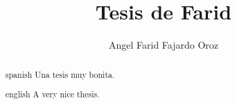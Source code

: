 \documentclass{tesisITAM}
\title{Tesis de Farid}
\author{Angel Farid Fajardo Oroz}
\begin{document}
	\npthousandsep{,}
	\maketitle
	\publicationrights
	

	
	


	\begin{abstract}{spanish}
		Una tesis muy bonita.
	\end{abstract}

	\begin{abstract}{english}
		A very nice thesis.
	\end{abstract}

	\setcounter{page}{1}

	\tableofcontents
	\listoffigures
	\listoftables
	\newpage

	\setcounter{page}{1}


	

	

	

	

	
	

	\appendix

	\clearpage


	

\end{document}

